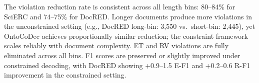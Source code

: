 \begin{table}[h]
\centering
\small
\caption{Violation reduction percentage by document length bin (Qwen3-8B, S1 constraints).}
\label{tab:doc-length-reduction}
\end{table}

The violation reduction rate is consistent across all length bins: 80--84\% for SciERC and 74--75\% for DocRED.
Longer documents produce more violations in the unconstrained setting (e.g., DocRED long-bin: 3,550 vs.\ short-bin: 2,445), yet OntoCoDec achieves proportionally similar reduction; the constraint framework scales reliably with document complexity.
ET and RV violations are fully eliminated across all bins.
F1 scores are preserved or slightly improved under constrained decoding, with DocRED showing +0.9--1.5 E-F1 and +0.2--0.6 R-F1 improvement in the constrained setting.
